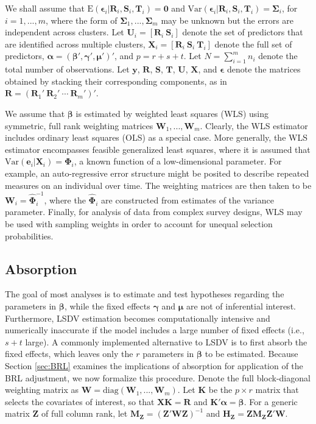 \documentclass[12pt]{article}\usepackage[]{graphicx}\usepackage[]{color}
\newcommand{\E}{\text{E}}
\newcommand{\Var}{\text{Var}}
\newcommand{\bm}{\mathbf}
\newcommand{\bs}{\boldsymbol}
\begin{document}
We shall assume that $\E\left(\bs\epsilon_i\left|\bm{R}_i,\bm{S}_i, \bm{T}_i\right.\right) = \bm{0}$ and $\Var\left(\bs\epsilon_i\left|\bm{R}_i,\bm{S}_i,\bm{T}_i\right.\right) = \bs\Sigma_i$, for $i = 1,...,m$, where the form of $\bs\Sigma_1,...,\bs\Sigma_m$ may be unknown but the errors are independent across clusters. 
Let $\bm{U}_i = \left[\bm{R}_i \ \bm{S}_i \right]$ denote the set of predictors that are identified across multiple clusters, $\bm{X}_i = \left[\bm{R}_i \ \bm{S}_i \ \bm{T}_i \right]$ denote the full set of predictors, $\bs\alpha = \left(\bs\beta', \bs\gamma', \bs\mu' \right)'$, and $p = r + s + t$.
Let $N = \sum_{i=1}^m n_i$ denote the total number of observations.
Let $\bm{y}$, $\bm{R}$, $\bm{S}$, $\bm{T}$, $\bm{U}$, $\bm{X}$, and $\bs\epsilon$ denote the matrices obtained by stacking their corresponding components, as in $\bm{R} = \left(\bm{R}_1' \ \bm{R}_2' \ \cdots \ \bm{R}_m'\right)'$. 

We assume that $\bs\beta$ is estimated by weighted least squares (WLS) using symmetric, full rank weighting matrices $\bm{W}_1,...,\bm{W}_m$. 
Clearly, the WLS estimator includes ordinary least squares (OLS) as a special case.
More generally, the WLS estimator encompasses feasible generalized least squares, where it is assumed that $\Var\left(\bm{e}_i\left|\bm{X}_i\right.\right) = \bs\Phi_i$, a known function of a low-dimensional parameter. 
For example, an auto-regressive error structure might be posited to describe repeated measures on an individual over time. 
The weighting matrices are then taken to be $\bm{W}_i = \hat{\bs\Phi}_i^{-1}$, where the $\hat{\bs\Phi}_i$ are constructed from estimates of the variance parameter.
Finally, for analysis of data from complex survey designs, WLS may be used with sampling weights in order to account for unequal selection probabilities.

\subsection{Absorption}

The goal of most analyses is to estimate and test hypotheses regarding the parameters in $\bs\beta$, while the fixed effects $\bs\gamma$ and $\bs\mu$ are not of inferential interest. Furthermore, LSDV estimation becomes computationally intensive and numerically inaccurate if the model includes a large number of fixed effects (i.e., $s + t$ large). 
A commonly implemented alternative to LSDV is to first absorb the fixed effects, which leaves only the $r$ parameters in $\bs\beta$ to be estimated. 
Because Section \ref{sec:BRL} examines the implications of absorption for application of the BRL adjustment, we now formalize this procedure.
Denote the full block-diagonal weighting matrix as $\bm{W} = \text{diag}\left(\bm{W}_1,...,\bm{W}_m\right)$.
Let $\bm{K}$ be the $p \times r$ matrix that selects the covariates of interest, so that $\bm{X} \bm{K} = \bm{R}$ and $\bm{K}'\bs\alpha = \bs\beta$.
For a generic matrix $\bm{Z}$ of full column rank, let $\bm{M_Z} = \left(\bm{Z}'\bm{W}\bm{Z}\right)^{-1}$ and $\bm{H_Z} = \bm{Z}\bm{M_Z}\bm{Z}'\bm{W}$. 
\end{document}
